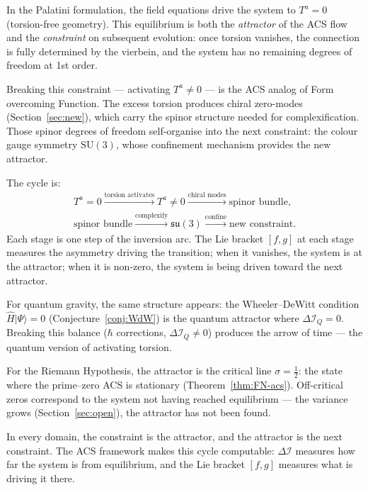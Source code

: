 \documentclass[12pt,a4paper]{article}
\theoremstyle{plain}
\theoremstyle{definition}
\theoremstyle{remark}
\newcommand{\DI}{\Delta\mathcal{I}}
\begin{document}
In the Palatini formulation, the field equations drive the system
to $T^a = 0$ (torsion-free geometry).  This equilibrium is both
the \emph{attractor} of the ACS flow and the \emph{constraint}
on subsequent evolution: once torsion vanishes, the connection is
fully determined by the vierbein, and the system has no remaining
degrees of freedom at 1st order.

Breaking this constraint --- activating $T^a \neq 0$ --- is the
ACS analog of Form overcoming Function.  The excess torsion produces
chiral zero-modes (Section~\ref{sec:new}), which carry the spinor
structure needed for complexification.  Those spinor degrees of
freedom self-organise into the next constraint: the colour gauge
symmetry $\mathrm{SU}(3)$, whose confinement mechanism provides
the new attractor.

The cycle is:
\[
\begin{gathered}
  T^a=0 \xrightarrow{\text{torsion activates}} T^a\ne0
  \xrightarrow{\text{chiral modes}} \text{spinor bundle},\\
  \text{spinor bundle}\xrightarrow{\text{complexify}}\mathfrak{su}(3)
  \xrightarrow{\text{confine}}\text{new constraint}.
\end{gathered}
\]
Each stage is one step of the inversion arc.
The Lie bracket $[f,g]$ at each stage measures the asymmetry
driving the transition; when it vanishes, the system is at the
attractor; when it is non-zero, the system is being driven
toward the next attractor.

For quantum gravity, the same structure appears:
the Wheeler--DeWitt condition $\hat{H}|\Psi\rangle = 0$
(Conjecture~\ref{conj:WdW}) is the quantum attractor where
$\DI_Q = 0$.  Breaking this balance ($\hbar$ corrections,
$\DI_Q \neq 0$) produces the arrow of time --- the quantum
version of activating torsion.

For the Riemann Hypothesis, the attractor is the critical line
$\sigma = \tfrac{1}{2}$: the state where the prime--zero ACS is
stationary (Theorem~\ref{thm:FN-acs}).  Off-critical zeros
correspond to the system not having reached equilibrium --- the
variance grows (Section~\ref{sec:open}), the attractor has
not been found.

In every domain, the constraint is the attractor, and the attractor
is the next constraint.  The ACS framework makes this cycle
computable: $\DI$ measures how far the system is from equilibrium,
and the Lie bracket $[f,g]$ measures what is driving it there.

\end{document}
